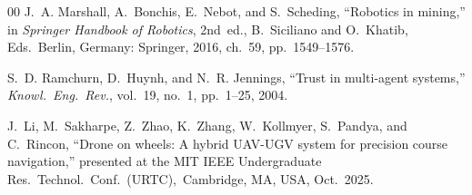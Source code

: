 \documentclass[conference]{IEEEtran}
\begin{document}
\begin{thebibliography}{00}
J.~A. Marshall, A.~Bonchis, E.~Nebot, and S.~Scheding,
``Robotics in mining,''
in \emph{Springer Handbook of Robotics}, 2nd~ed.,
B.~Siciliano and O.~Khatib, Eds.\
Berlin, Germany: Springer, 2016, ch.~59, pp.~1549--1576.

S.~D. Ramchurn, D.~Huynh, and N.~R. Jennings,
``Trust in multi-agent systems,''
\emph{Knowl.\ Eng.\ Rev.}, vol.~19, no.~1, pp.~1--25, 2004.

J.~Li, M.~Sakharpe, Z.~Zhao, K.~Zhang, W.~Kollmyer, S.~Pandya, and C.~Rincon,
``Drone on wheels: A hybrid UAV-UGV system for precision course navigation,''
presented at the MIT IEEE Undergraduate Res.\ Technol.\ Conf.\ (URTC),\
Cambridge, MA, USA, Oct.\ 2025.

\end{thebibliography}
\end{document}
